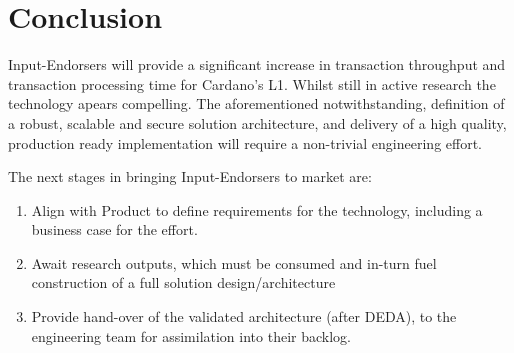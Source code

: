 \documentclass[11pt,a4paper]{article}
\begin{document}
\pagebreak

\section{Conclusion}
Input-Endorsers will provide a significant increase in transaction throughput and transaction processing time for 
Cardano's L1. Whilst still in active research the technology apears compelling. The aforementioned notwithstanding, 
definition of a robust, scalable and secure solution architecture, and delivery of a high quality, production ready 
implementation will require a non-trivial engineering effort.

The next stages in bringing Input-Endorsers to market are:

\begin{enumerate}
  \item Align with Product to define requirements for the technology, including a business case for the effort.
  \item Await research outputs, which must be consumed and in-turn fuel construction of a full solution 
        design/architecture
  \item Provide hand-over of the validated architecture (after DEDA), to the engineering team for assimilation into 
        their backlog. 
\end{enumerate}

\pagebreak

\printglossaries
\end{document}
